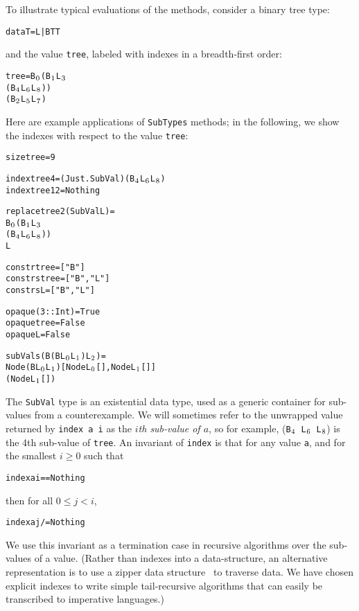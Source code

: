 \documentclass{sigplanconf}
\newenvironment{code}{\begin{alltt}\footnotesize}{\end{alltt}}
\newcommand{\ttp}[1]{\texttt{#1}}
\newcommand{\sub}[1]{\(\sb{#1}\)}
\begin{document}
\noindent
To illustrate typical evaluations of the methods, consider a binary tree type:
%
\begin{code}
data T = L | B T T
\end{code}
%
\noindent
and the value \ttp{tree}, labeled with indexes in a breadth-first order:
%
\begin{code}
tree = B\sub{0} (B\sub{1} L\sub{3}
             (B\sub{4} L\sub{6} L\sub{8}))
          (B\sub{2} L\sub{5} L\sub{7})
\end{code}
%
\noindent
Here are example applications of \ttp{SubTypes} methods; in the following, we
show the indexes with respect to the value \ttp{tree}:
%
\begin{code}
size tree = 9

index tree 4  = (Just . SubVal) (B\sub{4} L\sub{6} L\sub{8})
index tree 12 = Nothing

replace tree 2 (SubVal L) =
  B\sub{0} (B\sub{1} L\sub{3}
        (B\sub{4} L\sub{6} L\sub{8}))
     L

constr  tree = ["B"]
constrs tree = ["B", "L"]
constrs L    = ["B", "L"]

opaque (3 :: Int) = True
opaque tree       = False
opaque L          = False

subVals (B (B L\sub{0} L\sub{1}) L\sub{2}) =
  Node (B L\sub{0} L\sub{1}) [Node L\sub{0} [], Node L\sub{1} []]
       (Node L\sub{1} [])
\end{code}
%
\noindent
The \ttp{SubVal} type is an existential data type, used as a generic container
for sub-values from a counterexample.  We will sometimes refer to the unwrapped
value returned by \ttp{index a i} as the \emph{$i$th sub-value of $a$}, so for
example, (\ttp{B\sub{4} L\sub{6} L\sub{8}}) is the 4th sub-value of \ttp{tree}.
An invariant of \ttp{index} is that for any value \ttp{a}, and for the smallest
$i \geq 0$ such that
%
\begin{code}
index a i == Nothing
\end{code}
%
\noindent
then for all $0 \leq j < i$,
%
\begin{code}
index a j /= Nothing
\end{code}
\noindent
We use this invariant as a termination case in recursive algorithms over the
sub-values of a value.  (Rather than indexes into a data-structure, an
alternative representation is to use a zipper data structure~\cite{zipper} to
traverse data.  We have chosen explicit indexes to write simple tail-recursive
algorithms that can easily be transcribed to imperative languages.)
\end{document}
